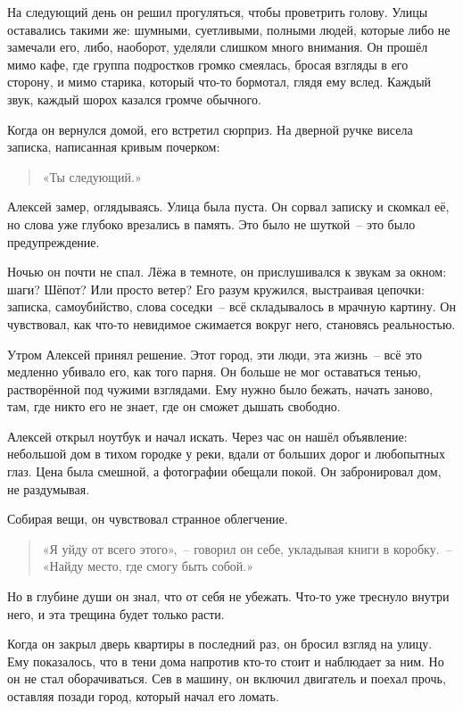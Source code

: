 \documentclass[12pt,a4paper]{book}
\begin{document}
На следующий день он решил прогуляться, чтобы проветрить голову. Улицы оставались такими же: шумными, суетливыми, полными людей, которые либо не замечали его, либо, наоборот, уделяли слишком много внимания. Он прошёл мимо кафе, где группа подростков громко смеялась, бросая взгляды в его сторону, и мимо старика, который что-то бормотал, глядя ему вслед. Каждый звук, каждый шорох казался громче обычного.

Когда он вернулся домой, его встретил сюрприз. На дверной ручке висела записка, написанная кривым почерком:
\begin{quote}
«Ты следующий.»
\end{quote}

Алексей замер, оглядываясь. Улица была пуста. Он сорвал записку и скомкал её, но слова уже глубоко врезались в память. Это было не шуткой~-- это было предупреждение.

Ночью он почти не спал. Лёжа в темноте, он прислушивался к звукам за окном: шаги? Шёпот? Или просто ветер? Его разум кружился, выстраивая цепочки: записка, самоубийство, слова соседки~-- всё складывалось в мрачную картину. Он чувствовал, как что-то невидимое сжимается вокруг него, становясь реальностью.

Утром Алексей принял решение. Этот город, эти люди, эта жизнь~-- всё это медленно убивало его, как того парня. Он больше не мог оставаться тенью, растворённой под чужими взглядами. Ему нужно было бежать, начать заново, там, где никто его не знает, где он сможет дышать свободно.

Алексей открыл ноутбук и начал искать. Через час он нашёл объявление: небольшой дом в тихом городке у реки, вдали от больших дорог и любопытных глаз. Цена была смешной, а фотографии обещали покой. Он забронировал дом, не раздумывая.

Собирая вещи, он чувствовал странное облегчение.
\begin{quote}
«Я уйду от всего этого»,~-- говорил он себе, укладывая книги в коробку.~-- «Найду место, где смогу быть собой.»
\end{quote}
Но в глубине души он знал, что от себя не убежать. Что-то уже треснуло внутри него, и эта трещина будет только расти.

Когда он закрыл дверь квартиры в последний раз, он бросил взгляд на улицу. Ему показалось, что в тени дома напротив кто-то стоит и наблюдает за ним. Но он не стал оборачиваться. Сев в машину, он включил двигатель и поехал прочь, оставляя позади город, который начал его ломать.
\end{document}
